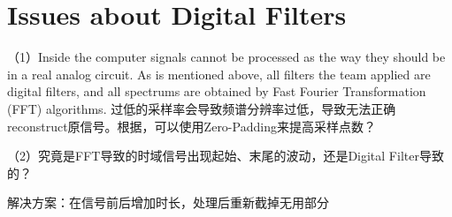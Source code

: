 \documentclass[../ECE459FinalProjectReport.tex]{subfiles}
\begin{document}
\section{Issues about Digital Filters}

（1）Inside the computer signals cannot be processed as the way they should be in a real analog circuit. As is mentioned above, all filters the team applied are digital filters, and all spectrums are obtained by Fast Fourier Transformation (FFT) algorithms. 过低的采样率会导致频谱分辨率过低，导致无法正确reconstruct原信号。根据\textcite[Sec. 7.3.3]{manolakisAppliedDigitalSignal2011}，可以使用Zero-Padding来提高采样点数？

（2）究竟是FFT导致的时域信号出现起始、末尾的波动，还是Digital Filter导致的？

解决方案：在信号前后增加时长，处理后重新截掉无用部分
\end{document}
